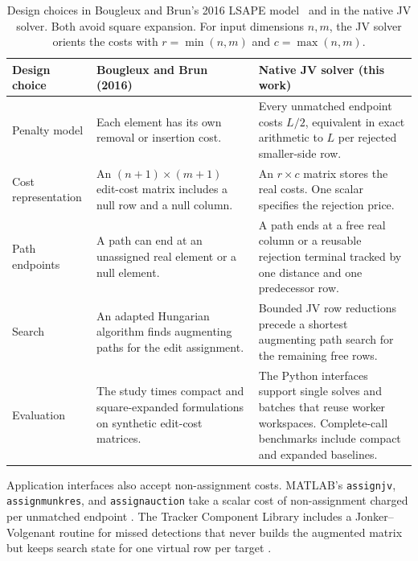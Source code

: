 \documentclass[11pt,a4paper]{article}
\begin{document}
\begin{table}[!htbp]
\centering
\caption{Design choices in Bougleux and Brun's 2016 LSAPE model~\cite{bougleux2016} and in the native JV solver. Both avoid square expansion. For input dimensions $n,m$, the JV solver orients the costs with $r=\min(n,m)$ and $c=\max(n,m)$.}
\label{tab:lsape-design}
\begingroup\small
\setlength{\tabcolsep}{5pt}
\renewcommand{\arraystretch}{1.12}
\begin{tabularx}{\linewidth}{@{}>{\raggedright\arraybackslash}p{.16\linewidth}>{\raggedright\arraybackslash}X>{\raggedright\arraybackslash}X@{}}
\toprule
Design choice & Bougleux and Brun (2016) & Native JV solver (this work) \\
\midrule
Penalty model & Each element has its own removal or insertion cost. & Every unmatched endpoint costs $L/2$, equivalent in exact arithmetic to $L$ per rejected smaller-side row. \\
\addlinespace
Cost representation & An $(n+1)\times(m+1)$ edit-cost matrix includes a null row and a null column. & An $r\times c$ matrix stores the real costs. One scalar specifies the rejection price. \\
\addlinespace
Path endpoints & A path can end at an unassigned real element or a null element. & A path ends at a free real column or a reusable rejection terminal tracked by one distance and one predecessor row. \\
\addlinespace
Search & An adapted Hungarian algorithm finds augmenting paths for the edit assignment. & Bounded JV row reductions precede a shortest augmenting path search for the remaining free rows. \\
\addlinespace
Evaluation & The study times compact and square-expanded formulations on synthetic edit-cost matrices. & The Python interfaces support single solves and batches that reuse worker workspaces. Complete-call benchmarks include compact and expanded baselines. \\
\bottomrule
\end{tabularx}
\endgroup
\end{table}

Application interfaces also accept non-assignment costs. MATLAB's \texttt{assignjv}, \texttt{assignmunkres}, and \texttt{assignauction} take a scalar cost of non-assignment charged per unmatched endpoint \cite{mathworks2018assign}. The Tracker Component Library includes a Jonker--Volgenant routine for missed detections that never builds the augmented matrix but keeps search state for one virtual row per target \cite{crouse2017tcl}.
\end{document}
